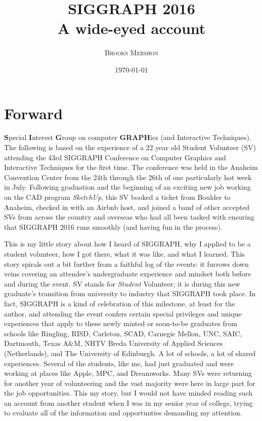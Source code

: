 \documentclass[a4paper, 11pt]{article} %
\title{\textbf{SIGGRAPH 2016}\\ %
A wide-eyed account} %
\author{\textsc{Brooks Mershon}} %
\date{\today} %
\begin{document}
\maketitle %

\eject


\renewcommand{\abstractname}{Forward} %

\section*{Forward}
	
\textbf{S}pecial \textbf{I}nterest \textbf{G}roup on computer \textbf{GRAPH}ics (and Interactive Techniques). The following is based on the experience of a 22 year old Student Volunteer (SV) attending the 43rd SIGGRAPH Conference on Computer Graphics and Interactive Techniques for the first time. The conference was held in the Anaheim Convention Center from the 24th through the 26th of one particularly hot week in July. Following graduation and the beginning of an exciting new job working on the CAD program \textit{SketchUp}, this SV booked a ticket from Boulder to Anaheim, checked in with an Airbnb host, and joined a band of other accepted SVs from across the country and overseas who had all been tasked with ensuring that SIGGRAPH 2016 runs smoothly (and having fun in the process).

This is my little story about how I heard of SIGGRAPH, why I applied to be a student volunteer, how I got there, what it was like, and what I learned. This story spirals out a bit further from a faithful log of the events: it furrows down veins covering an attendee's undergraduate experience and mindset both before and during the event. SV stands for \textit{Student} Volunteer; it is during this new graduate's transition from university to industry that SIGGRAPH took place. In fact, SIGGRAPH is a kind of celebration of this milestone, at least for the author, and attending the event confers certain special privileges and unique experiences that apply to these newly minted or soon-to-be graduates from schools like Ringling, RISD, Carleton, SCAD, Carnegie Mellon, UNC, SAIC, Dartmouth, Texas A\&M, NHTV Breda University of Applied Sciences (Netherlands), and The University of Edinburgh. A lot of schools, a lot of shared experiences. Several of the students, like me, had just graduated and were working at places like Apple, MPC, and Dreamworks. Many SVs were returning for another year of volunteering and the vast majority were here in large part for the job opportunities. This my story, but I would not have minded reading such an account from another student when I was in my senior year of college, trying to evaluate all of the information and opportunties demanding my attention.
\end{document}
